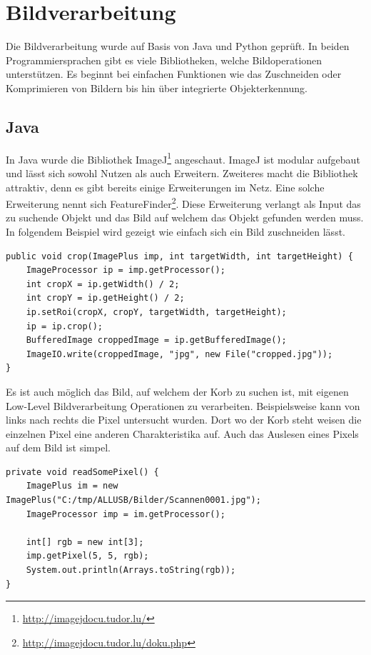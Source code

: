 \section{Bildverarbeitung}
\label{anhang-bildverarbeitung}
Die Bildverarbeitung wurde auf Basis von Java und Python geprüft. In beiden Programmiersprachen gibt es viele Bibliotheken, welche Bildoperationen unterstützen. Es beginnt bei einfachen Funktionen wie das Zuschneiden oder Komprimieren von Bildern bis hin über integrierte Objekterkennung.

\subsection{Java}
In Java wurde die Bibliothek ImageJ\footnote{\href{http://imagejdocu.tudor.lu/}{http://imagejdocu.tudor.lu/}} angeschaut. ImageJ ist modular aufgebaut und lässt sich sowohl Nutzen als auch Erweitern. Zweiteres macht die Bibliothek attraktiv, denn es gibt bereits einige Erweiterungen im Netz. Eine solche Erweiterung nennt sich FeatureFinder\footnote{\href{http://imagejdocu.tudor.lu/doku.php?id=plugin:analysis:feature_finder:start}{http://imagejdocu.tudor.lu/doku.php}}. Diese Erweiterung verlangt als Input das zu suchende Objekt und das Bild auf welchem das Objekt gefunden werden muss. In folgendem Beispiel wird gezeigt wie einfach sich ein Bild zuschneiden lässt.

\begin{lstlisting}[caption={Bild zuschneiden mit ImageJ}]
public void crop(ImagePlus imp, int targetWidth, int targetHeight) {
	ImageProcessor ip = imp.getProcessor();
	int cropX = ip.getWidth() / 2;
	int cropY = ip.getHeight() / 2;
	ip.setRoi(cropX, cropY, targetWidth, targetHeight);
	ip = ip.crop();
	BufferedImage croppedImage = ip.getBufferedImage();
	ImageIO.write(croppedImage, "jpg", new File("cropped.jpg"));
}
\end{lstlisting}

Es ist auch möglich das Bild, auf welchem der Korb zu suchen ist, mit eigenen Low-Level Bildverarbeitung Operationen zu verarbeiten. Beispielsweise kann von links nach rechts die Pixel untersucht wurden. Dort wo der Korb steht weisen die einzelnen Pixel eine anderen Charakteristika auf. Auch das Auslesen eines Pixels auf dem Bild ist simpel.

\begin{lstlisting}[caption={Auslesen eines Pixels mit ImageJ}]
private void readSomePixel() {
	ImagePlus im = new ImagePlus("C:/tmp/ALLUSB/Bilder/Scannen0001.jpg");
	ImageProcessor imp = im.getProcessor();

	int[] rgb = new int[3];
	imp.getPixel(5, 5, rgb);
	System.out.println(Arrays.toString(rgb));
}
\end{lstlisting}

